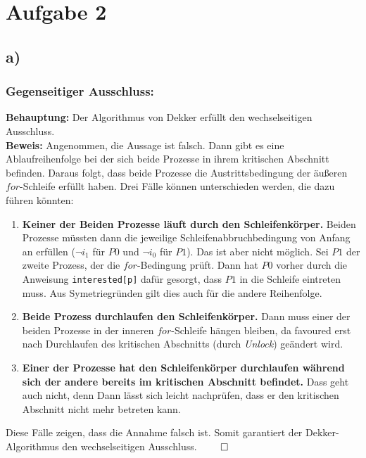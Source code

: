 \documentclass[11pt,a4paper,DIV=10,]{scrartcl}
\begin{document}
\section*{Aufgabe 2}
\subsection*{a)}
\subsubsection*{Gegenseitiger Ausschluss:}
\textbf{Behauptung:} Der Algorithmus von Dekker erfüllt den wechselseitigen Ausschluss.\\
\textbf{Beweis:} Angenommen, die Aussage ist falsch. Dann gibt es eine Ablaufreihenfolge bei der sich beide Prozesse in ihrem kritischen Abschnitt befinden. Daraus folgt, dass beide Prozesse die Austrittsbedingung  der äußeren $for$-Schleife erfüllt haben. Drei Fälle können unterschieden werden, die dazu führen könnten:
\begin{enumerate}
\item \textbf{Keiner der Beiden Prozesse läuft durch den Schleifenkörper.} Beiden Prozesse müssten dann die jeweilige Schleifenabbruchbedingung von Anfang an erfüllen ($\neg i_1$ für $P0$ und $\neg i_0$ für $P1$). Das ist aber nicht möglich. Sei $P1$ der zweite Prozess, der die $for$-Bedingung prüft. Dann hat $P0$ vorher durch die Anweisung  \texttt{interested[p]} dafür gesorgt, dass $P1$ in die Schleife eintreten muss. Aus Symetriegründen gilt dies auch für die andere Reihenfolge.
\item \textbf{Beide Prozess durchlaufen den Schleifenkörper.} Dann muss einer der beiden Prozesse in der inneren $for$-Schleife hängen bleiben, da favoured erst nach Durchlaufen des kritischen Abschnitts (durch \textit{Unlock}) geändert wird.
\item \textbf{Einer der Prozesse hat den Schleifenkörper durchlaufen während sich der andere bereits im kritischen Abschnitt befindet.} Dass geht auch nicht, denn Dann lässt sich leicht nachprüfen, dass er den kritischen Abschnitt nicht mehr betreten kann.
\end{enumerate}
Diese Fälle zeigen, dass die Annahme falsch ist. Somit garantiert der Dekker-Algorithmus den wechselseitigen Ausschluss. $ \qed$
\end{document}
